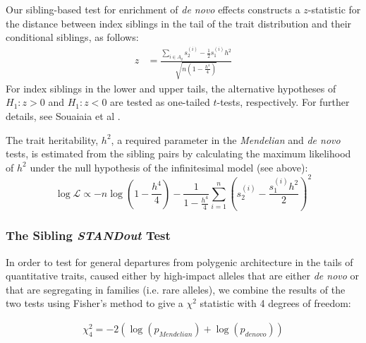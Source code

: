 \documentclass[12pt]{zHenriquesLab-StyleBioRxiv}
\begin{document}
{{Our sibling-based test for enrichment of {\em de novo} effects constructs a $z$-statistic 
for the distance between index siblings in the tail of the trait
distribution and their conditional siblings, as follows:
\begin{align*}
  z&=\frac{\sum_{i\in A_q}s_2^{(i)}-\frac{1}{2}s_1^{(i)}h^2} {\sqrt{n(1-\frac{h^4}{4})}}
\end{align*}
For index siblings in the lower and upper tails, the alternative
hypotheses of $H_1: z>0$ and $H_1: z<0$ are tested as one-tailed $t$-tests, respectively. For further details, 
see Souaiaia et al \cite{Souaiaia2024}.

The trait heritability, $h^2$, a required parameter in the {\em Mendelian} and {\em de novo} tests, 
is estimated from the sibling pairs by calculating the maximum likelihood of $h^2$ 
under the null hypothesis of the infinitesimal model (see above): 
\begin{equation*} \log \mathcal{L} \propto -n\log\left(1 -
    \frac{h^4}{4}\right) - \frac{1}{1-\frac{h^4}{4}} \sum_{i=1}^n
  \left( s_{2}^{(i)} - \frac{s_1^{(i)} h^2}{2}
  \right)^2
\end{equation*}

\subsubsection*{The Sibling \textit{STANDout}  Test} 

In order to test for general departures from polygenic architecture in the tails of 
quantitative traits, caused either by high-impact alleles that are either \emph{de novo} or 
that are segregating in families (i.e. rare alleles), we combine the results of the two tests 
using Fisher's method to give a $\chi^2$ statistic with 4 degrees of freedom: 

\begin{align*}
    \chi^2_4 = -2(\log(p_{Mendelian}) + \log(p_{de novo}))
\end{align*}
















}}
\end{document}
